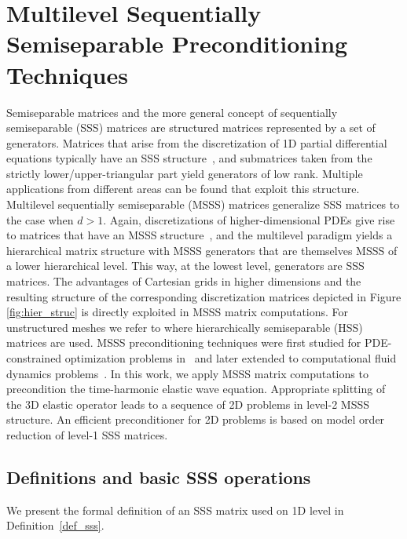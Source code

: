 \section{Multilevel Sequentially Semiseparable P\-re\-cond\-itioning Techniques}
\label{ch:msss}
{\justify
Semiseparable matrices \cite{VV07} and the more general concept of sequentially sem\-iseparable (SSS) matrices \cite{CD05,sss_techrep03} are structured matrices represented by a set of generators. Matrices that arise from the discretization of 1D partial differential equations typically have an SSS structure~\cite{RT10}, and submatrices taken from the strict\-ly lower/upper-triangular part yield generators of low rank. Multiple applications from different areas can be found \cite{DV98,KM00,RV09aa} that exploit this structure. Multilevel sequentially sem\-iseparable (MSSS) matrices generalize SSS matrices to the case when $d>1$. Again, discretizations of higher-dimensional PDEs give rise to matrices that have an MSSS structure~\cite{QG15}, and the multilevel paradigm yields a hierarchical matrix structure with MSSS generators that are themselves MSSS of a lower hierarchical level. This way, at the lowest level, generators are SSS matrices. The advantages of Cartesian grids in higher dimensions and the resulting structure of the corresponding discretization matrices depicted in Figure \ref{fig:hier_struc} is directly exploited in MSSS matrix computations. For unstructured meshes we refer to \cite{HSS13} where hierarchically semiseparable (HSS) matrices are used. MSSS preconditioning techniques were first studied for PDE-constrained optimization problems in~\cite{QG15} and later extended to computational fluid dynamics problems~\cite{QG15a}. In this work, we apply MSSS matrix computations to precondition the time-harmonic elastic wave equation. Appropriate splitting of the 3D elastic operator leads to a sequence of 2D problems in level-2 MSSS structure. An efficient preconditioner for 2D problems is based on model order reduction of level-1 SSS matrices. 

\subsection{Definitions and basic SSS operations}
\label{ch:sss_level1}
We present the formal definition of an SSS matrix used on 1D level in Definition~\ref{def_sss}.

}
